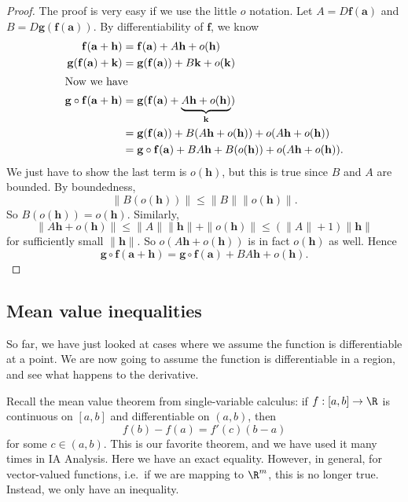 \documentclass[a4paper]{article}
\begin{document}
\begin{proof}
  The proof is very easy if we use the little $o$ notation. Let $A = D\mathbf{f}(\mathbf{a})$ and $B = D \mathbf{g}(\mathbf{f}(\mathbf{a}))$. By differentiability of $\mathbf{f}$, we know
  \begin{align*}
    \mathbf{f}(\mathbf{a} + \mathbf{h}) &= \mathbf{f}(\mathbf{a}) + A \mathbf{h} + o(\mathbf{h})\\
    \mathbf{g}(\mathbf{f}(\mathbf{a}) + \mathbf{k}) &= \mathbf{g}(\mathbf{f}(\mathbf{a})) + B\mathbf{k} + o(\mathbf{k})\\
    \intertext{Now we have}
    \mathbf{g}\circ \mathbf{f}(\mathbf{a} + \mathbf{h}) &= \mathbf{g}(\mathbf{f}(\mathbf{a}) + \underbrace{A \mathbf{h} + o(\mathbf{h})}_{\mathbf{k}})\\
    &= \mathbf{g}(\mathbf{f}(\mathbf{a})) + B(A \mathbf{h} + o(\mathbf{h})) + o(A \mathbf{h} + o(\mathbf{h}))\\
    &= \mathbf{g}\circ \mathbf{f}(\mathbf{a}) + B A \mathbf{h} + B(o(\mathbf{h})) + o(A \mathbf{h} + o(\mathbf{h})).
  \end{align*}
  We just have to show the last term is $o(\mathbf{h})$, but this is true since $B$ and $A$ are bounded. By boundedness,
  \[
    \|B(o(\mathbf{h}))\| \leq \|B\|\|o (\mathbf{h})\|.
  \]
  So $B(o(\mathbf{h})) = o(\mathbf{h})$. Similarly,
  \[
    \|A\mathbf{h} + o(\mathbf{h})\| \leq \|A\| \|\mathbf{h}\| + \|o (\mathbf{h})\| \leq (\|A\| + 1)\|\mathbf{h}\|
  \]
  for sufficiently small $\|\mathbf{h}\|$. So $o(A \mathbf{h} + o(\mathbf{h}))$ is in fact $o(\mathbf{h})$ as well. Hence
  \[
    \mathbf{g}\circ \mathbf{f}(\mathbf{a} + \mathbf{h}) = \mathbf{g} \circ \mathbf{f}(\mathbf{a}) + BA \mathbf{h} + o(\mathbf{h}).
  \]
\end{proof}

\subsection{Mean value inequalities}
So far, we have just looked at cases where we assume the function is differentiable at a point. We are now going to assume the function is differentiable in a region, and see what happens to the derivative.

Recall the mean value theorem from single-variable calculus: if $f: [a, b] \to \R$ is continuous on $[a, b]$ and differentiable on $(a, b)$, then
\[
  f(b) - f(a) = f'(c) (b - a)
\]
for some $c \in (a, b)$. This is our favorite theorem, and we have used it many times in IA Analysis. Here we have an exact equality. However, in general, for vector-valued functions, i.e.\ if we are mapping to $\R^m$, this is no longer true. Instead, we only have an inequality.
\end{document}
